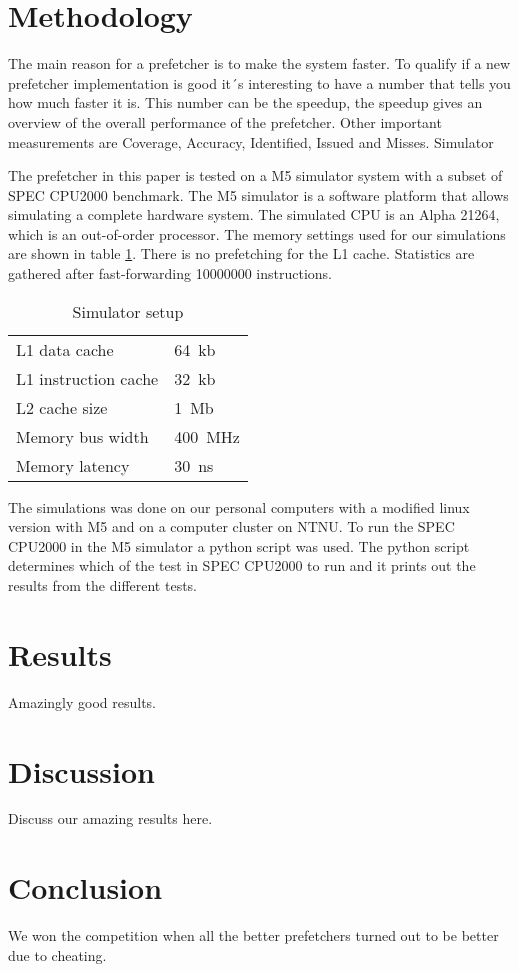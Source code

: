 \documentclass[journal,a4paper]{IEEEtran}
\begin{document}
\section{Methodology}
The main reason for a prefetcher is to make the system faster. To qualify if a new prefetcher implementation is good it´s interesting to have a number that tells you how much faster it is. This number can be the speedup, the speedup gives an overview of the overall performance of the prefetcher. Other important measurements are Coverage, Accuracy, Identified, Issued and Misses. 
Simulator

The prefetcher in this paper is tested on a M5 simulator system with a subset of SPEC CPU2000 benchmark. The M5 simulator is a software platform that allows simulating a complete hardware system. The simulated CPU is an Alpha 21264, which is an out-of-order processor. The memory settings used for our simulations are shown in table \ref{tab:simsetup}. There is no prefetching for the L1 cache. Statistics are gathered after fast-forwarding 10000000 instructions.

\begin{table}[h]
	\caption{Simulator setup}
	\label{tab:simsetup}
	\centering

	\begin{tabular}{|l|l|}
		\hline
		L1 data cache & 64~kb \\
		L1 instruction cache & 32~kb \\
		L2 cache size & 1~Mb \\
		Memory bus width & 400~MHz \\
		Memory latency & 30~ns \\
		\hline
	\end{tabular}
\end{table}


The simulations was done on our personal computers with a modified linux version with M5 and on a computer cluster on NTNU. To run the SPEC CPU2000 in the M5 simulator a python script was used. The python script determines which of the test in SPEC CPU2000 to run and it prints out the results from the different tests. 


\section{Results}
Amazingly good results.

\section{Discussion}
Discuss our amazing results here.

\section{Conclusion}
We won the competition when all the better prefetchers turned out to be better due to cheating.
\end{document}
